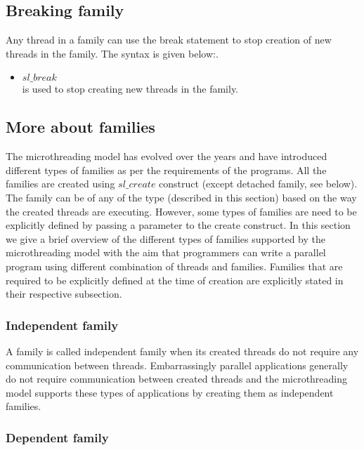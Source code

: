 \documentclass{article}
\begin{document}
\subsection*{Breaking family}

Any thread in a family can use the break statement to stop creation of new threads
in the family. The syntax is given below:.

\begin{itemize}
\item $sl\_break$ \\is used to stop creating new threads in the family.
\end{itemize}

\subsection{More about families}

The microthreading model has evolved over the years and have introduced
different types of families as per the requirements of the programs. All the
families are created using $sl\_create$ construct (except detached family, see
below). The family can be of any of the type (described in this section)
based on the way the created threads are executing. However, some types of
families are need to be explicitly defined by passing a parameter to the create
construct. In this section we give a brief overview of the different types of
families supported by the microthreading model with the aim that programmers
can write a parallel program using different combination of threads and
families. Families that are required to be explicitly defined at the time of
creation are explicitly stated in their respective subsection.

\subsubsection*{Independent family}

A family is called independent family when its created threads do not require
any communication between threads. Embarrassingly parallel applications
generally do not require communication between created threads and the
microthreading model supports these types of applications by creating them as
independent families.

\subsubsection*{Dependent family}
\end{document}
